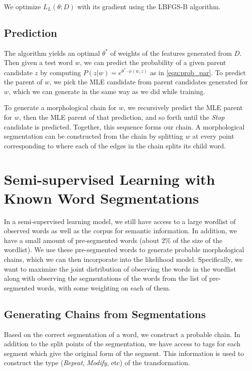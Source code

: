 \documentclass[11pt,twocolumn]{article}
\begin{document}
We optimize $L_L(\theta; D)$ with its gradient using the LBFGS-B algorithm.

\subsection{Prediction}
The algorithm yields an optimal $\theta^*$ of weights of the features generated from $D$. Then given a test word $w$, we can predict the probability of a given parent candidate $z$ by computing $P(z|w)=e^{\theta^*\cdot\phi(w,z)}$ as in \autoref{equ:prob_par}. To predict the parent of $w$, we pick the MLE candidate from parent candidates generated for $w$, which we can generate in the same way as we did while training.

To generate a morphological chain for $w$, we recursively predict the MLE parent for $w$, then the MLE parent of that prediction, and so forth until the \emph{Stop} candidate is predicted. Together, this sequence forms our chain. A morphological segmentation can be constructed from the chain by splitting $w$ at every point corresponding to where each of the edges in the chain splits its child word.

\section{Semi-supervised Learning with Known Word Segmentations}
In a semi-supervised learning model, we still have access to a large wordlist of observed words as well as the corpus for semantic information. In addition, we have a small amount of pre-segmented words (about 2\% of the size of the wordlist). We use these pre-segmented words to generate probable morphological chains, which we can then incorporate into the likelihood model. Specifically, we want to maximize the joint distribution of observing the words in the wordlist along with observing the segmentations of the words from the list of pre-segmented words, with some weighting on each of them.

\subsection{Generating Chains from Segmentations}
Based on the correct segmentation of a word, we construct a probable chain. In addition to the split points of the segmentation, we have access to tags for each segment which give the original form of the segment. This information is used to construct the type (\emph{Repeat}, \emph{Modify}, etc) of the transformation.
\end{document}
